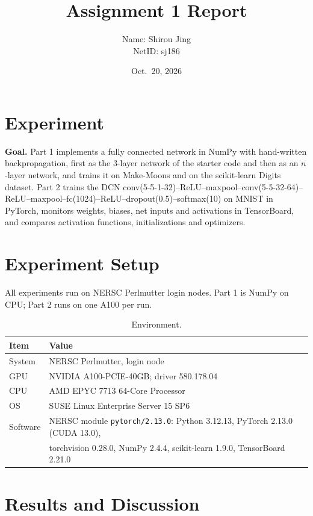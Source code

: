 \documentclass[11pt]{article}
\title{Assignment 1 Report}
\author{Name: Shirou Jing\\NetID: sj186}
\date{Oct.\ 20, 2026}
\begin{document}
\maketitle

\section{Experiment}

\textbf{Goal.} Part 1 implements a fully connected network in NumPy with hand-written backpropagation, first as the 3-layer network of the starter code and then as an $n$-layer network, and trains it on Make-Moons and on the scikit-learn Digits dataset. Part 2 trains the DCN conv(5-5-1-32)--ReLU--maxpool--conv(5-5-32-64)--ReLU--maxpool--fc(1024)--ReLU--dropout(0.5)--softmax(10) on MNIST in PyTorch, monitors weights, biases, net inputs and activations in TensorBoard, and compares activation functions, initializations and optimizers.

\section{Experiment Setup}

All experiments run on NERSC Perlmutter login nodes. Part 1 is NumPy on CPU; Part 2 runs on one A100 per run.

\begin{table}[H]
\centering
\caption{Environment.}
\begin{tabular}{ll}
\toprule
Item & Value \\
\midrule
System & NERSC Perlmutter, login node \\
GPU & NVIDIA A100-PCIE-40GB; driver 580.178.04 \\
CPU & AMD EPYC 7713 64-Core Processor \\
OS & SUSE Linux Enterprise Server 15 SP6 \\
Software & NERSC module \texttt{pytorch/2.13.0}: Python 3.12.13, PyTorch 2.13.0 (CUDA 13.0), \\
 & torchvision 0.28.0, NumPy 2.4.4, scikit-learn 1.9.0, TensorBoard 2.21.0 \\
\bottomrule
\end{tabular}
\end{table}

\section{Results and Discussion}
\end{document}
